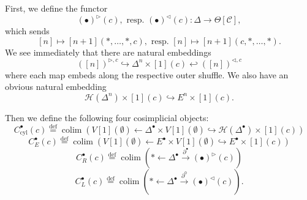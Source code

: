 \documentclass[leqno]{article}
\numberwithin{equation}{subsection}
\theoremstyle{plain}   %
\theoremstyle{remark}
\theoremstyle{plain}
\DeclareMathOperator{\colim}{colim}
\newcommand{\C}{\ensuremath{\mathcal{C}}}
\newcommand{\defeq}{\overset{\mathrm{def}}=}
\begin{document}
First, we define the functor
\[(\bullet)^{\triangleright}(c),\text{ resp. }(\bullet)^{\triangleleft}(c): \Delta \to \Theta[\C],\]
which sends
\[[n]\mapsto [n+1](\ast,\dots,\ast,c), \text{ resp. } [n]\mapsto [n+1](c,\ast,\dots,\ast).\]
We see immediately that there are natural embeddings
\[([n])^{\triangleright,c} \hookrightarrow \Delta^n \times [1](c)  \hookleftarrow ([n])^{\triangleleft,c}\]
where each map embeds along the respective outer shuffle. We also have an obvious natural embedding
\[\mathscr{H}(\Delta^n)\times [1](c) \hookrightarrow E^n\times [1](c).\]

Then we define the following four cosimplicial objects:
\[C^\bullet_{\mathrm{cyl}}(c)\defeq \colim \left( V[1](\emptyset) \leftarrow \Delta^\bullet \times V[1](\emptyset) \hookrightarrow \mathscr{H}(\Delta^\bullet)\times [1](c)\right)\]
\[C^\bullet_{E}(c)\defeq \colim \left( V[1](\emptyset) \leftarrow E^\bullet \times V[1](\emptyset) \hookrightarrow E^\bullet\times [1](c)\right)\]
\[C^\bullet_{R}(c)\defeq \colim \left( \ast \leftarrow \Delta^\bullet \xrightarrow{\partial^{\bullet}} (\bullet)^\triangleright(c)\right)\]
\[C^\bullet_{L}(c)\defeq \colim \left( \ast \leftarrow \Delta^\bullet \xrightarrow{\partial^0} (\bullet)^\triangleleft(c)\right).\]
\end{document}
